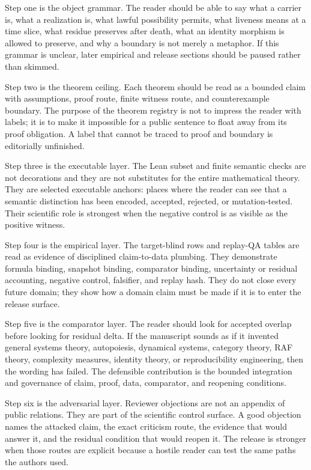 Step one is the object grammar. The reader should be able to say what a carrier is, what a realization is, what lawful possibility permits, what liveness means at a time slice, what residue preserves after death, what an identity morphism is allowed to preserve, and why a boundary is not merely a metaphor. If this grammar is unclear, later empirical and release sections should be paused rather than skimmed.

Step two is the theorem ceiling. Each theorem should be read as a bounded claim with assumptions, proof route, finite witness route, and counterexample boundary. The purpose of the theorem registry is not to impress the reader with labels; it is to make it impossible for a public sentence to float away from its proof obligation. A label that cannot be traced to proof and boundary is editorially unfinished.

Step three is the executable layer. The Lean subset and finite semantic checks are not decorations and they are not substitutes for the entire mathematical theory. They are selected executable anchors: places where the reader can see that a semantic distinction has been encoded, accepted, rejected, or mutation-tested. Their scientific role is strongest when the negative control is as visible as the positive witness.

Step four is the empirical layer. The target-blind rows and replay-QA tables are read as evidence of disciplined claim-to-data plumbing. They demonstrate formula binding, snapshot binding, comparator binding, uncertainty or residual accounting, negative control, falsifier, and replay hash. They do not close every future domain; they show how a domain claim must be made if it is to enter the release surface.

Step five is the comparator layer. The reader should look for accepted overlap before looking for residual delta. If the manuscript sounds as if it invented general systems theory, autopoiesis, dynamical systems, category theory, RAF theory, complexity measures, identity theory, or reproducibility engineering, then the wording has failed. The defensible contribution is the bounded integration and governance of claim, proof, data, comparator, and reopening conditions.

Step six is the adversarial layer. Reviewer objections are not an appendix of public relations. They are part of the scientific control surface. A good objection names the attacked claim, the exact criticism route, the evidence that would answer it, and the residual condition that would reopen it. The release is stronger when those routes are explicit because a hostile reader can test the same paths the authors used.

